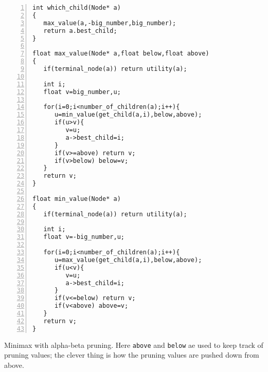 \documentclass[11pt,a4paper]{scrartcl}
\begin{document}
   
\begin{table}
\begin{lstlisting}[numbers=left]
int which_child(Node* a)
{
   max_value(a,-big_number,big_number);
   return a.best_child;
}

float max_value(Node* a,float below,float above)
{
   if(terminal_node(a)) return utility(a);

   int i;
   float v=big_number,u;
   
   for(i=0;i<number_of_children(a);i++){
      u=min_value(get_child(a,i),below,above);
      if(u>v){
         v=u;
         a->best_child=i;
      }
      if(v>=above) return v;
      if(v>below) below=v;
   }
   return v;
}

float min_value(Node* a)
{
   if(terminal_node(a)) return utility(a);

   int i;
   float v=-big_number,u;
   
   for(i=0;i<number_of_children(a);i++){
      u=max_value(get_child(a,i),below,above);
      if(u<v){
         v=u;
         a->best_child=i;
      }
      if(v<=below) return v;
      if(v<above) above=v;
   }
   return v;
}
\end{lstlisting}
\caption{Minimax with alpha-beta pruning. Here \texttt{above} and \texttt{below} ae used to keep track of pruning values; the clever thing is how the pruning values are pushed down from above.\label{c_alpha_beta}}
\end{table}
\end{document}
